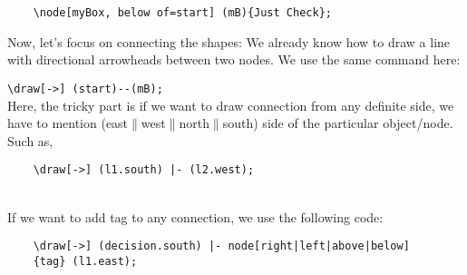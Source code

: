 \documentclass{article}
\begin{document}
\begin{verbatim}
    \node[myBox, below of=start] (mB){Just Check};
\end{verbatim}

Now,  let's focus on connecting the shapes: We already know how to draw a line with directional arrowheads between two nodes. We use the same command here:

\verb|\draw[->] (start)--(mB);|\\
Here, the tricky part is if we want to draw connection from any definite side, we have to mention (east$\|$west$\|$north$\|$south) side of the particular object/node. Such as,\\
\begin{verbatim}
    \draw[->] (l1.south) |- (l2.west);
\end{verbatim}\\

If we want to add tag to any connection, we use the following code:
\begin{verbatim}
    \draw[->] (decision.south) |- node[right|left|above|below]
    {tag} (l1.east);
\end{verbatim}
\end{document}
